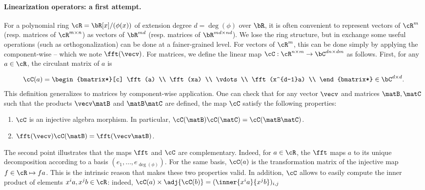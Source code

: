 \paragraph{Linearization operators: a first attempt.} For a polynomial ring $\cR = \bR[x]/(\phi(x))$ of extension degree $d=\deg(\phi)$ over $\bR$, it is often convenient to represent vectors of $\cR^m$ (resp. matrices of $\cR^{m\times n}$) as vectors of $\bR^{md}$ (resp. matrices of $\bR^{md\times nd}$). We lose the ring structure, but in exchange some useful operations (such as orthogonalization) can be done at a fainer-grained level. For vectors of $\cR^m$, this can be done simply by applying the \fft{} component-wise -- which we note $\fft(\vecv)$. For matrices, we define the linear map $\cC : \cR^{n\times m} \rightarrow \bC^{dn \times dm}$ as follows. First, for any $a\in \cR$, the circulant matrix of $a$ is

 \begin{equation}
\cC(a) = \begin{bmatrix*}[c]   \fft(a) \\
\fft(xa) \\
 \vdots \\
\fft(x^{d-1}a) \\ \end{bmatrix*} \in \bC^{d\times d}.
\end{equation}
This definition generalizes to matrices by component-wise application. One can check that for any vector $\vecv$ and matrices $\matB,\matC$ such that the products $\vecv \matB$ and $\matB \matC$ are defined, the map $\cC$ satisfy the following properties:
\begin{enumerate}
 \item
 $\cC$ is an injective algebra morphism. In particular, $\cC(\matB) \cC(\matC) = \cC(\matB \matC)$.
 \item\label{item:circ}
 $\fft(\vecv)\cC(\matB) = \fft(\vecv \matB)$.
\end{enumerate}

The second point illustrates that the maps $\fft$ and $\cC$ are complementary. Indeed, for $a\in \cR$, the $\fft$ maps $a$ to its unique decomposition according to a basis $(e_1,\dots,e_{\deg(\phi)})$. For the same basis, $\cC(a)$ is the transformation matrix of the injective map $f \in \cR \mapsto f a$. This is the intrinsic reason that makes these two properties valid. In addition, $\cC$ allows to easily compute the inner product of elements $x^i a, x^j b\in\cR$: indeed, $\cC(a) \times \adj{\cC(b)} = (\inner{x^i a}{x^j b})_{i,j}$

